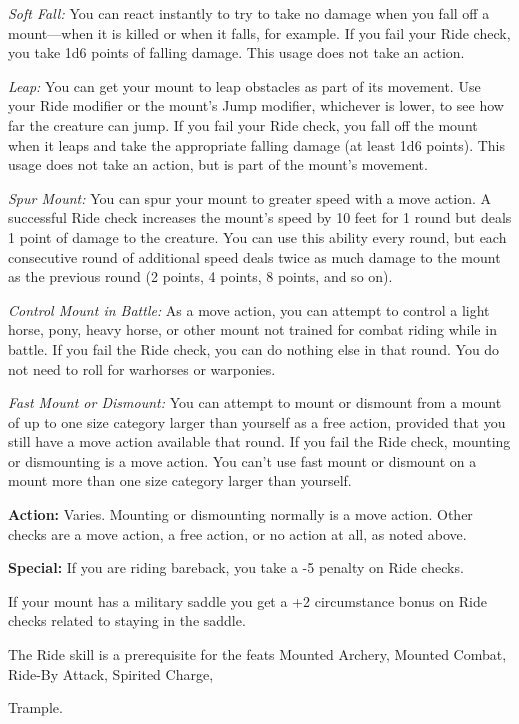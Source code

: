 \documentclass{article}
\begin{document}
\textit{Soft Fall: }You can react instantly to try to take no damage when you fall 
off a mount---when it is killed or when it falls, for example. If you fail your 
Ride check, you take 1d6 points of falling damage. This usage does not take an 
action.

\textit{Leap: }You can get your mount to leap obstacles as part of its movement. 
Use your Ride modifier or the mount's Jump modifier, whichever is lower, to see 
how far the creature can jump. If you fail your Ride check, you fall off the mount 
when it leaps and take the appropriate falling damage (at least 1d6 points). This 
usage does not take an action, but is part of the mount's movement.

\textit{Spur Mount: }You can spur your mount to greater speed with a move action. 
A successful Ride check increases the mount's speed by 10 feet for 1 round but 
deals 1 point of damage to the creature. You can use this ability every round, 
but each consecutive round of additional speed deals twice as much damage to the 
mount as the previous round (2 points, 4 points, 8 points, and so on).

\textit{Control Mount in Battle: }As a move action, you can attempt to control 
a light horse, pony, heavy horse, or other mount not trained for combat riding 
while in battle. If you fail the Ride check, you can do nothing else in that round. 
You do not need to roll for warhorses or warponies.

\textit{Fast Mount or Dismount: }You can attempt to mount or dismount from a mount 
of up to one size category larger than yourself as a free action, provided that 
you still have a move action available that round. If you fail the Ride check, 
mounting or dismounting is a move action. You can't use fast mount or dismount 
on a mount more than one size category larger than yourself.

\textbf{Action:} Varies. Mounting or dismounting normally is a move action. Other 
checks are a move action, a free action, or no action at all, as noted above.

\textbf{Special:} If you are riding bareback, you take a -5 penalty on Ride checks.

If your mount has a military saddle you get a +2 circumstance bonus on Ride checks 
related to staying in the saddle.

The Ride skill is a prerequisite for the feats Mounted Archery, Mounted Combat, 
Ride-By Attack, Spirited Charge,

Trample.
\end{document}
